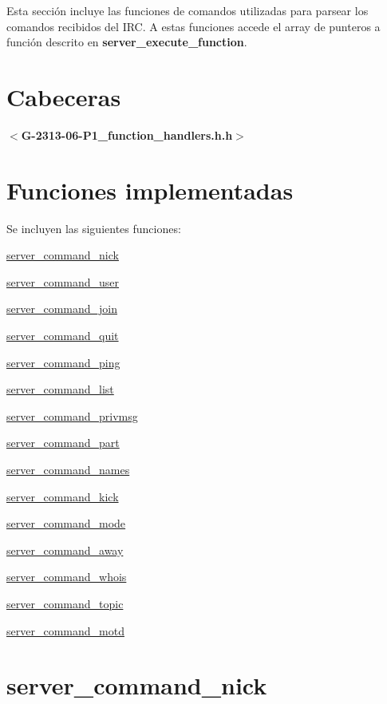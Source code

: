Esta sección incluye las funciones de comandos utilizadas para parsear los comandos recibidos del I\+RC. A estas funciones accede el array de punteros a función descrito en {\bfseries server\+\_\+execute\+\_\+function}.\hypertarget{server_commands_cabeceras3}{}\section{Cabeceras}\label{server_commands_cabeceras3}
{ {\bfseries $<$G-\/2313-\/06-\/\+P1\+\_\+function\+\_\+handlers.\+h.\+h$>$} } \hypertarget{server_commands_functions3}{}\section{Funciones implementadas}\label{server_commands_functions3}
Se incluyen las siguientes funciones\+: 
\begin{DoxyItemize}
\item \hyperlink{server_command_nick}{server\+\_\+command\+\_\+nick} 
\item \hyperlink{server_command_user}{server\+\_\+command\+\_\+user} 
\item \hyperlink{server_command_join}{server\+\_\+command\+\_\+join} 
\item \hyperlink{server_command_quit}{server\+\_\+command\+\_\+quit} 
\item \hyperlink{server_command_ping}{server\+\_\+command\+\_\+ping} 
\item \hyperlink{server_command_list}{server\+\_\+command\+\_\+list} 
\item \hyperlink{server_command_privmsg}{server\+\_\+command\+\_\+privmsg} 
\item \hyperlink{server_command_part}{server\+\_\+command\+\_\+part} 
\item \hyperlink{server_command_names}{server\+\_\+command\+\_\+names} 
\item \hyperlink{server_command_kick}{server\+\_\+command\+\_\+kick} 
\item \hyperlink{server_command_mode}{server\+\_\+command\+\_\+mode} 
\item \hyperlink{server_command_away}{server\+\_\+command\+\_\+away} 
\item \hyperlink{server_command_whois}{server\+\_\+command\+\_\+whois} 
\item \hyperlink{server_command_topic}{server\+\_\+command\+\_\+topic} 
\item \hyperlink{server_command_motd}{server\+\_\+command\+\_\+motd} 
\end{DoxyItemize}\hypertarget{server_command_nick}{}\section{server\+\_\+command\+\_\+nick}\label{server_command_nick}
